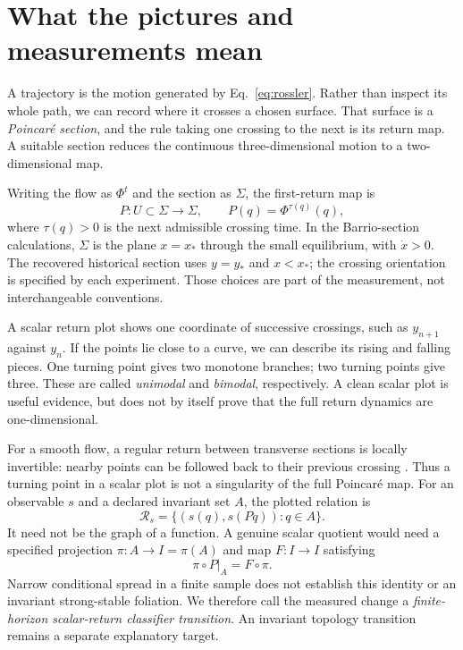 \section{What the pictures and measurements mean}
\label{sec:objects}

A trajectory is the motion generated by Eq.~\eqref{eq:rossler}. Rather than
inspect its whole path, we can record where it crosses a chosen surface.
That surface is a \emph{Poincar\'e section}, and the rule taking one crossing
to the next is its return map. A suitable section reduces the continuous
three-dimensional motion to a two-dimensional map.

Writing the flow as $\Phi^t$ and the section as $\Sigma$, the first-return map
is
\begin{equation}
  P:U\subset\Sigma\longrightarrow\Sigma,\qquad
  P(q)=\Phi^{\tau(q)}(q),
\end{equation}
where $\tau(q)>0$ is the next admissible crossing time. In the
Barrio-section calculations, $\Sigma$ is the plane $x=x_*$ through the
small equilibrium, with $\dot{x}>0$. The recovered historical section uses
$y=y_*$ and $x<x_*$; the crossing orientation is specified by each experiment.
Those choices are part of the measurement, not interchangeable conventions.

A scalar return plot shows one coordinate of successive crossings, such as
$y_{n+1}$ against $y_n$. If the points lie close to a curve, we can describe
its rising and falling pieces. One turning point gives two monotone branches;
two turning points give three. These are called \emph{unimodal} and
\emph{bimodal}, respectively. A clean scalar plot is useful evidence, but does
not by itself prove that the full return dynamics are one-dimensional.

For a smooth flow, a regular return between transverse sections is locally
invertible: nearby points can be followed back to their previous crossing
\citep[Secs.~6.4 and 12.2]{teschl2012ordinary}. Thus a turning point in a
scalar plot is not a singularity of the full Poincar\'e map. For an observable
$s$ and a declared invariant set $A$, the plotted relation is
\[
  \mathcal R_s=\{(s(q),s(Pq)):q\in A\}.
\]
It need not be the graph of a function. A genuine scalar quotient would need
a specified projection $\pi:A\to I=\pi(A)$ and map $F:I\to I$ satisfying
\begin{equation}
  \pi\circ P|_A=F\circ\pi.
  \label{eq:quotient-condition}
\end{equation}
Narrow conditional spread in a finite sample does not establish this
identity or an invariant strong-stable foliation. We therefore call the
measured change a \emph{finite-horizon scalar-return classifier transition}.
An invariant topology transition remains a separate explanatory target.

